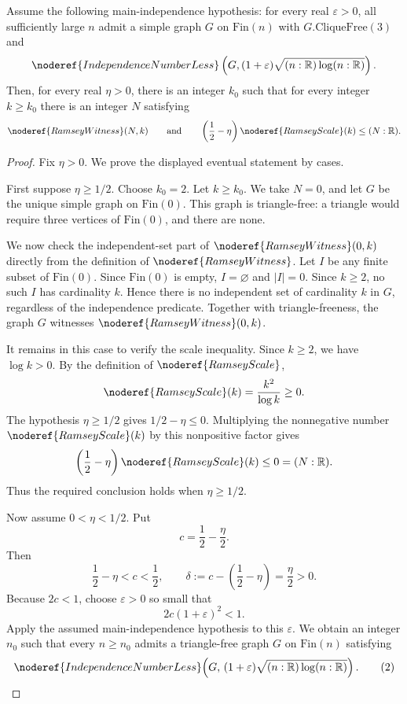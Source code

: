 \begin{lemma}
Assume the following main-independence hypothesis: for every real
\(\varepsilon>0\), all sufficiently large \(n\) admit a simple graph \(G\) on
\(\mathrm{Fin}(n)\) with \(G.\mathrm{CliqueFree}(3)\) and
\[
\noderef{IndependenceNumberLess}
\left(G,(1+\varepsilon)\sqrt{(n:\mathbb R)\log(n:\mathbb R)}\right).
\]
Then, for every real \(\eta>0\), there is an integer \(k_0\) such that for
every integer \(k\ge k_0\) there is an integer \(N\) satisfying
\[
\noderef{RamseyWitness}(N,k)
\qquad\text{and}\qquad
\left(\frac12-\eta\right)\noderef{RamseyScale}(k)\le (N:\mathbb R).
\]
\end{lemma}
\begin{proof}
Fix \(\eta>0\).  We prove the displayed eventual statement by cases.

First suppose \(\eta\ge1/2\).  Choose \(k_0=2\).  Let \(k\ge k_0\).  We take
\(N=0\), and let \(G\) be the unique simple graph on \(\mathrm{Fin}(0)\).  This
graph is triangle-free: a triangle would require three vertices of
\(\mathrm{Fin}(0)\), and there are none.

We now check the independent-set part of
\(\noderef{RamseyWitness}(0,k)\) directly from the definition of
\(\noderef{RamseyWitness}\).  Let \(I\) be any finite subset of
\(\mathrm{Fin}(0)\).  Since \(\mathrm{Fin}(0)\) is empty, \(I=\varnothing\) and
\(|I|=0\).  Since \(k\ge2\), no such \(I\) has cardinality \(k\).  Hence there
is no independent set of cardinality \(k\) in \(G\), regardless of the
independence predicate.  Together with triangle-freeness, the graph \(G\)
witnesses \(\noderef{RamseyWitness}(0,k)\).

It remains in this case to verify the scale inequality.  Since \(k\ge2\), we
have \(\log k>0\).  By the definition of \(\noderef{RamseyScale}\),
\[
\noderef{RamseyScale}(k)=\frac{k^2}{\log k}\ge0.
\]
The hypothesis \(\eta\ge1/2\) gives \(1/2-\eta\le0\).  Multiplying the
nonnegative number \(\noderef{RamseyScale}(k)\) by this nonpositive factor gives
\[
\left(\frac12-\eta\right)\noderef{RamseyScale}(k)\le0=(N:\mathbb R).
\]
Thus the required conclusion holds when \(\eta\ge1/2\).

Now assume \(0<\eta<1/2\).  Put
\[
c=\frac12-\frac{\eta}{2}.
\]
Then
\[
\frac12-\eta<c<\frac12,
\qquad
\delta:=c-\left(\frac12-\eta\right)=\frac{\eta}{2}>0.
\]
Because \(2c<1\), choose \(\varepsilon>0\) so small that
\[
2c(1+\varepsilon)^2<1. \tag{1}
\]
Apply the assumed main-independence hypothesis to this \(\varepsilon\).  We
obtain an integer \(n_0\) such that every \(n\ge n_0\) admits a triangle-free
graph \(G\) on \(\mathrm{Fin}(n)\) satisfying
\[
\noderef{IndependenceNumberLess}\!\left(
G,\,(1+\varepsilon)\sqrt{(n:\mathbb R)\log(n:\mathbb R)}\right). \tag{2}
\]


\end{proof}
